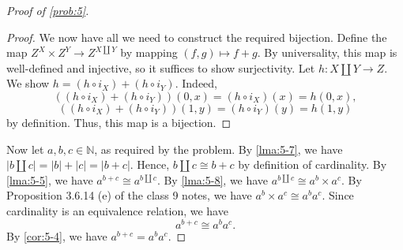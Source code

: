 \documentclass[11pt, letterpaper]{article}
\theoremstyle{definition}
\begin{document}
\begin{proof}[Proof of \cref{prob:5}]
\begin{proof}
		We now have all we need to construct the required bijection. Define the map $Z^X \times Z^Y \to Z^{X\amalg Y} $ by mapping $(f,g)\mapsto f+g$. By universality, this map is well-defined and injective, so it suffices to show surjectivity. Let $h : X\amalg Y \to Z$. We show $h=(h\circ i_X)+(h\circ i_Y)$. Indeed,
		\[
			((h\circ i_X)+(h\circ i_Y))(0,x) = (h\circ i_X)(x) = h(0,x),
		\]
		\[
			((h\circ i_X)+(h\circ i_Y))(1,y) = (h\circ i_Y)(y) = h(1,y)
		\]
		by definition. Thus, this map is a bijection.
	\end{proof}
	Now let $a,b,c\in\mathbb{N} $, as required by the problem. By \cref{lma:5-7}, we have $\left| b \amalg c \right| = \left| b \right| +\left| c \right| =\left| b+c \right| $. Hence, $b \amalg c \cong b+c$ by definition of cardinality. By \cref{lma:5-5}, we have $a^{b+c} \cong a^{b\amalg c} $. By \cref{lma:5-8}, we have $a^{b \amalg c} \cong a^b \times a^c$. By Proposition 3.6.14 (e) of the class 9 notes, we have $a^b \times a^c \cong a^b a^c$. Since cardinality is an equivalence relation, we have
	\[
		a^{b+c} \cong a^ba^c
	.\]
	By \cref{cor:5-4}, we have $a^{b+c} =a^ba^c$.
\end{proof}




\end{document}
